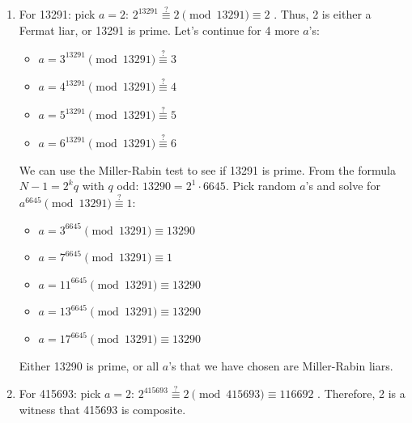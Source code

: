 {\begin{enumerate}
\begin{itemize}
\begin{align*}
                    k_0 &= 2813 \pmod{8911} \\
                    k_1 &= 2813^2 \pmod{8911} \equiv 1 \\
                    k_2 &= 1^2 \pmod{8911} \equiv 1 \\
                    &\vdots
                \end{align*} Since we did not have any result of \(a^{2^k \cdot q} = N - 1\), 8911 is not prime with 5 as a Miller-Rabin witness.
              \end{itemize} 
        \item For 13291: pick \(a = 2\): \(2^{13291} \stackrel{?}{\equiv} 2 \pmod{13291} \equiv 2\) \cmark. Thus, 2 is either a Fermat liar, or 13291 is prime. Let's continue for 4 more \(a\)'s:
              \begin{itemize}
                  \item \(a = 3^{13291} \pmod{13291} \stackrel{?}{\equiv} 3\)\ \cmark%
                  \item \(a = 4^{13291} \pmod{13291} \stackrel{?}{\equiv} 4\)\ \cmark%
                  \item \(a = 5^{13291} \pmod{13291} \stackrel{?}{\equiv} 5\)\ \cmark%
                  \item \(a = 6^{13291} \pmod{13291} \stackrel{?}{\equiv} 6\)\ \cmark%
              \end{itemize}
              We can use the Miller-Rabin test to see if 13291 is prime. From the formula \(N - 1 = 2^kq\) with \(q\) odd: \(13290 = 2^1 \cdot 6645\). Pick random \(a\)'s and solve for \(a^{6645} \pmod{13291} \stackrel{?}{\equiv} 1\):
              \begin{itemize}
                  \item \(a = 3^{6645} \pmod{13291} \equiv 13290\)\ \cmark%
                  \item \(a = 7^{6645} \pmod{13291} \equiv 1\)\ \cmark%
                  \item \(a = 11^{6645} \pmod{13291} \equiv 13290\)\ \cmark%
                  \item \(a = 13^{6645} \pmod{13291} \equiv 13290\)\ \cmark%
                  \item \(a = 17^{6645} \pmod{13291} \equiv 13290\)\ \cmark%
              \end{itemize} Either 13290 is prime, or all \(a\)'s that we have chosen are Miller-Rabin liars.
        \item For 415693: pick \(a = 2\): \(2^{415693} \stackrel{?}{\equiv} 2 \pmod{415693} \equiv 116692\) \xmark. Therefore, 2 is a witness that 415693 is composite.
    \end{enumerate}
}



